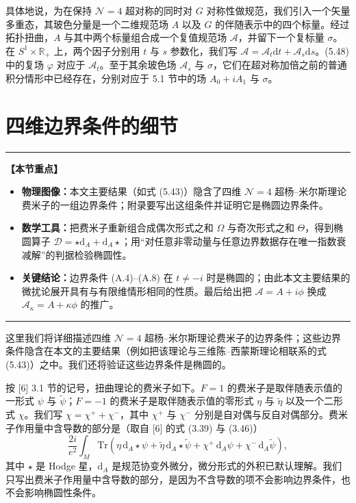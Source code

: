 \documentclass[11pt,a4paper,UTF8]{ctexart}
\theoremstyle{plain}
\theoremstyle{definition}
\newenvironment{keypoints}{%
  \par\addvspace{0.9em}%
  \noindent\begin{minipage}{\linewidth}%
  \color{black!80}\rule{\linewidth}{0.6pt}\par\vspace{2pt}%
  \noindent\textbf{【本节重点】}\par\vspace{2pt}%
  \begin{itemize}[leftmargin=1.6em,itemsep=1pt,topsep=2pt,parsep=0pt]%
}{%
  \end{itemize}\vspace{1pt}\noindent\color{black!80}\rule{\linewidth}{0.6pt}%
  \end{minipage}\par\addvspace{0.9em}%
}
\begin{document}
具体地说，为在保持 $\mathcal{N}=4$ 超对称的同时对 $G$ 对称性做规范，我们引入一个矢量多重态，其玻色分量是一个二维规范场 $A$ 以及 $G$ 的伴随表示中的四个标量。经过拓扑扭曲，$A$ 与其中两个标量组合成一个复值规范场 $\mathcal{A}$，并留下一个复标量 $\sigma$。在 $S^1\times\mathbb{R}_+$ 上，两个因子分别用 $t$ 与 $s$ 参数化，我们写 $\mathcal{A}=\mathcal{A}_t\mathrm{d}t+\mathcal{A}_s\mathrm{d}s$。(5.48) 中的复场 $\varphi$ 对应于 $\mathcal{A}_t$。至于其余玻色场 $\mathcal{A}_s$ 与 $\sigma$，它们在超对称加倍之前的普通积分情形中已经存在，分别对应于 5.1 节中的场 $A_0+iA_1$ 与 $\sigma$。


\appendix
\section{四维边界条件的细节}
\begin{keypoints}
    \item \textbf{物理图像：}本文主要结果（如式 (5.43)）隐含了四维 $\mathcal{N}=4$ 超杨–米尔斯理论费米子的一组边界条件；附录要写出这组条件并证明它是椭圆边界条件。
    \item \textbf{数学工具：}把费米子重新组合成偶次形式之和 $\Omega$ 与奇次形式之和 $\Theta$，得到椭圆算子 $\mathcal{D}=\star\mathrm{d}_A+\mathrm{d}_A\star$；用“对任意非零动量与任意边界数据存在唯一指数衰减解”的判据检验椭圆性。
    \item \textbf{关键结论：}边界条件 (A.4)–(A.8) 在 $t\neq -i$ 时是椭圆的；由此本文主要结果的微扰论展开具有与有限维情形相同的性质。最后给出把 $\mathcal{A}=A+i\phi$ 换成 $\mathcal{A}_\kappa=A+\kappa\phi$ 的推广。
\end{keypoints}

这里我们将详细描述四维 $\mathcal{N}=4$ 超杨–米尔斯理论费米子的边界条件；这些边界条件隐含在本文的主要结果（例如把该理论与三维陈–西蒙斯理论相联系的式 (5.43)）之中。我们还将验证这些边界条件是椭圆的。

按 [6] 3.1 节的记号，扭曲理论的费米子如下。$F=1$ 的费米子是取伴随表示值的一形式 $\psi$ 与 $\tilde\psi$；$F=-1$ 的费米子是取伴随表示值的零形式 $\eta$ 与 $\tilde\eta$ 以及一个二形式 $\chi$。我们写 $\chi=\chi^++\chi^-$，其中 $\chi^+$ 与 $\chi^-$ 分别是自对偶与反自对偶部分。费米子作用量中含导数的部分是（取自 [6] 的式 (3.39) 与 (3.46)）
\begin{equation}
    \frac{2i}{e^2}\int_M \mathrm{Tr}\left(\eta\,\mathrm{d}_A\star\psi+\tilde\eta\,\mathrm{d}_A\star\tilde\psi+\chi^+\,\mathrm{d}_A\psi+\chi^-\,\mathrm{d}_A\tilde\psi\right),
    \tag{A.1}
\end{equation}
其中 $\star$ 是 Hodge 星，$\mathrm{d}_A$ 是规范协变外微分，微分形式的外积已默认理解。我们只写出费米子作用量中含导数的部分，是因为不含导数的项不会影响边界条件，也不会影响椭圆性条件。
\end{document}
